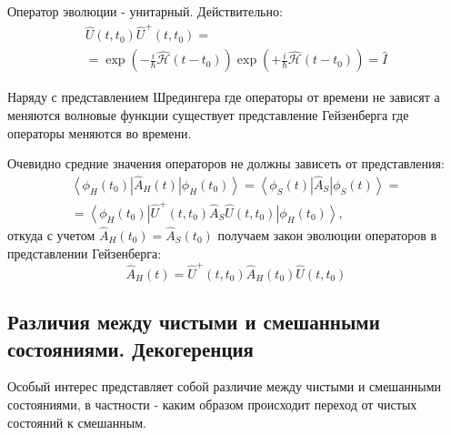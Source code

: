 Оператор эволюции - унитарный. Действительно:
\begin{eqnarray}
\hat{U}\left(t,t_0\right)\hat{U}^+\left(t,t_0\right) = 
\nonumber \\
= \exp\left( -\frac{i}{\hbar} \hat{\mathcal{H}} \left( t - t_0 \right)
\right)
\exp\left( +\frac{i}{\hbar} \hat{\mathcal{H}} \left( t - t_0 \right)
\right)
= \hat{I}
\nonumber
\end{eqnarray}

Наряду с представлением Шредингера где операторы от времени не зависят
а меняются волновые функции существует представление Гейзенберга где
операторы меняются во времени.

Очевидно средние значения операторов не должны зависеть от
представления:
\begin{eqnarray}
\left< \phi_H\left(t_0\right) \right|\hat{A}_H\left(t\right)\left| 
\phi_H\left(t_0\right) \right> = 
\left< \phi_S\left(t\right) \right|\hat{A}_S\left| 
\phi_S\left(t\right) \right> = 
\nonumber \\
=
\left<
\phi_H\left(t_0\right)\right|\hat{U}^+\left(t,t_0\right)\hat{A}_S\hat{U}\left(t,t_0\right)\left|
\phi_H\left(t_0\right) \right>,
\nonumber
\end{eqnarray}
откуда с учетом $\hat{A}_H\left(t_0\right) = \hat{A}_S\left(t_0\right)$ получаем закон эволюции операторов в представлении Гейзенберга:
\begin{equation}
\hat{A}_H\left(t\right) = \hat{U}^+\left(t,t_0\right)\hat{A}_H\left(t_0\right)\hat{U}\left(t,t_0\right)
\label{eqAddWaveFunc_HeizenbergU}
\end{equation}

\subsection{Различия между чистыми и смешанными
  состояниями. Декогеренция}
Особый интерес представляет собой различие между чистыми и смешанными
состояниями, в частности - каким образом происходит переход от чистых
состояний к смешанным.

